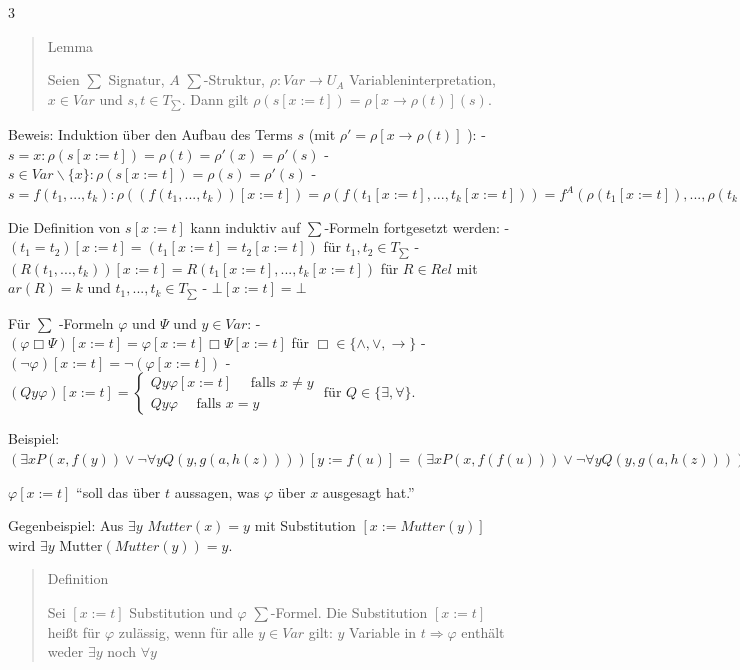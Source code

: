 \documentclass[a4paper]{article}
\begin{document}
\begin{multicols}{3}
  \begin{quote}
    Lemma

    Seien $\sum$ Signatur, $A$ $\sum$-Struktur, $\rho:Var\rightarrow U_A$
    Variableninterpretation, $x\in Var$ und $s,t\in T_{\sum}$. Dann gilt
    $\rho(s[x:=t])=\rho[x\rightarrow \rho(t)](s)$.
  \end{quote}

  Beweis: Induktion über den Aufbau des Terms $s$ (mit
  $\rho'=\rho[x\rightarrow \rho(t)]$ ): -
  $s=x:\rho(s[x:=t])=\rho(t) =\rho'(x) =\rho'(s)$ -
  $s\in Var\backslash\{x\}:\rho(s[x:=t])=\rho(s) =\rho'(s)$ -
  $s=f(t_1 ,...,t_k):\rho((f(t_1 ,...,t_k))[x:=t])= \rho(f(t_1[x:=t],...,t_k[x:=t]))= f^A(\rho(t_1[x:=t]),...,\rho(t_k[x:=t])) = f^A(\rho'(t_1),...,\rho'(t_k))= \rho'(f(t_1 ,...,t_k))=\rho'(s)$

  Die Definition von $s[x:=t]$ kann induktiv auf $\sum$-Formeln
  fortgesetzt werden: - $(t_1 =t_2 )[x:=t] = (t_1 [x:=t] =t_2 [x:=t])$ für
  $t_1 ,t_2 \in T_{\sum}$ -
  $(R(t_1 ,...,t_k))[x:=t] =R(t_1 [x:=t],...,t_k[x:=t])$ für $R\in Rel$
  mit $ar(R) =k$ und $t_1 ,...,t_k\in T_{\sum}$ - $\bot[x:=t] =\bot$

  Für $\sum$ -Formeln $\varphi$ und $\Psi$ und $y\in Var$: -
  $(\varphi\Box\Psi)[x:=t]=\varphi [x:=t]\Box\Psi[x:=t]$ für
  $\Box\in\{\wedge,\vee,\rightarrow\}$ -
  $(\lnot\varphi)[x:=t] = \lnot(\varphi[x:=t])$ -
  $(Qy\varphi)[x:=t] = \begin{cases} Qy\varphi[x:=t] \quad\text{ falls } x\not=y \\ Qy\varphi \quad\text{ falls } x=y \end{cases} \text{ für } Q\in\{\exists,\forall\}$.

  Beispiel:
  $(\exists x P(x,f(y))\vee\lnot\forall yQ(y,g(a,h(z))))[y:=f(u)] = (\exists x P(x,f(f(u)))\vee\lnot\forall yQ(y,g(a,h(z))))$

  $\varphi [x:=t]$ ``soll das über $t$ aussagen, was $\varphi$ über $x$
  ausgesagt hat.''

  Gegenbeispiel: Aus $\exists y$ $Mutter(x) =y$ mit Substitution
  $[x:=Mutter(y)]$ wird $\exists y$ Mutter$(Mutter(y)) =y$.

  \begin{quote}
    Definition

    Sei $[x:=t]$ Substitution und $\varphi$ $\sum$-Formel. Die Substitution
    $[x:=t]$ heißt für $\varphi$ zulässig, wenn für alle $y\in Var$ gilt:
    $y$ Variable in $t\Rightarrow\varphi$ enthält weder $\exists y$ noch
    $\forall y$
  \end{quote}


\end{multicols}
\end{document}
